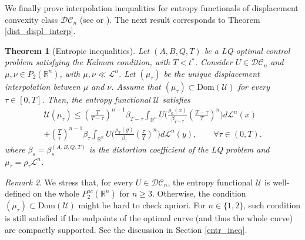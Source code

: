 \documentclass[reqno]{amsart}
\theoremstyle{plain}
\newtheorem{thm}{Theorem}[section]
\theoremstyle{definition}
\theoremstyle{remark}
\newtheorem{rem}[thm]{Remark}
\begin{document}
    We finally prove interpolation inequalities for entropy functionals of displacement convexity class $\mathcal{DC}_n$ (see \cite{McCann1997ACP} or \cite[Chapter 17]{Villanioldandnew}). The next result corresponds to Theorem \ref{dist_displ_interp}.
	 \begin{thm}[Entropic inequalities]
 	Let $(A,B,Q,T)$ be a LQ optimal control problem satisfying the Kalman condition, with $T<t^*$.
	 	Consider $U\in\mathcal{DC}_n$ and $\mu,\nu\in P_2(\mathbb{R}^n)$, with $\mu,\nu\ll \mathscr{L}^n$. Let $(\mu_\tau)$ be the unique displacement interpolation between $\mu$ and $\nu$. Assume that $(\mu_\tau)\subset\mathrm{Dom}(\mathcal{U})$ for every $\tau\in[0,T]$. Then, the entropy functional $\mathcal{U}$ satisfies
			\begin{multline}
				\mathcal{U}(\mu_\tau)\leq\left(\frac{T}{T-\tau}\right)^{n-1}\beta_{T-\tau}\int_{\mathbb{R}^n}U\bigg(\frac{\rho_0(x)}{\beta_{T-\tau}}\left(\frac{T-\tau}{T}\right)^n\bigg)d\mathscr{L}^n(x)\\
				+\left(\frac{T}{\tau}\right)^{n-1}\beta_{\tau}\int_{\mathbb{R}^n}U\bigg(\frac{\rho_T(y)}{\beta_{\tau}}\left(\frac{\tau}{T}\right)^n\bigg)d\mathscr{L}^n(y),\qquad\forall \tau\in(0,T).
			\end{multline}
            where $\beta_s=\beta_s^{(A,B,Q,T)}$ is the distortion coefficient of the LQ problem and $\mu_\tau=\rho_\tau\mathscr{L}^n$.
            \end{thm}
            \begin{rem}
           We stress that, for every $U\in\mathcal{DC}_n$, the entropy functional $\mathcal{U}$ is well-defined on the whole $P_2^{ac}(\mathbb{R}^n)$ for $n\geq 3$. Otherwise, the condition $(\mu_\tau)\subset\mathrm{Dom}(\mathcal{U})$ might be hard to check apriori. For $n\in\{1,2\}$, such condition is still satisfied if the endpoints of the optimal curve (and thus the whole curve) are compactly supported. See the discussion in Section \ref{entr_ineq}.
       \end{rem}
\end{document}
